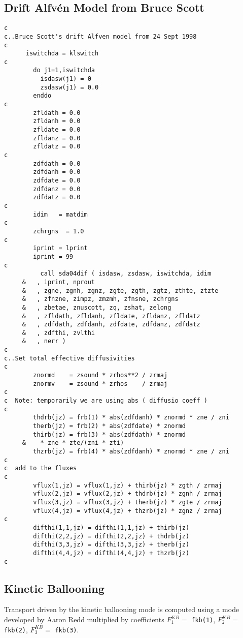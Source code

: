 \subsection{Drift Alfv\'en Model from Bruce Scott}

\begin{verbatim}
c
c..Bruce Scott's drift Alfven model from 24 Sept 1998
c
      iswitchda = klswitch
c
        do j1=1,iswitchda
          isdasw(j1) = 0
          zsdasw(j1) = 0.0
        enddo
c
        zfldath = 0.0
        zfldanh = 0.0
        zfldate = 0.0
        zfldanz = 0.0
        zfldatz = 0.0
c
        zdfdath = 0.0
        zdfdanh = 0.0
        zdfdate = 0.0
        zdfdanz = 0.0
        zdfdatz = 0.0
c
        idim   = matdim
c
        zchrgns  = 1.0
c
        iprint = lprint
        iprint = 99
c
          call sda04dif ( isdasw, zsdasw, iswitchda, idim
     &   , iprint, nprout
     &   , zgne, zgnh, zgnz, zgte, zgth, zgtz, zthte, ztzte
     &   , zfnzne, zimpz, zmzmh, zfnsne, zchrgns
     &   , zbetae, znuscott, zq, zshat, zelong
     &   , zfldath, zfldanh, zfldate, zfldanz, zfldatz
     &   , zdfdath, zdfdanh, zdfdate, zdfdanz, zdfdatz
     &   , zdfthi, zvlthi
     &   , nerr )
c
c..Set total effective diffusivities
c
        znormd    = zsound * zrhos**2 / zrmaj
        znormv    = zsound * zrhos    / zrmaj
c
c  Note: temporarily we are using abs ( diffusio coeff )
c
        thdrb(jz) = frb(1) * abs(zdfdanh) * znormd * zne / zni
        therb(jz) = frb(2) * abs(zdfdate) * znormd
        thirb(jz) = frb(3) * abs(zdfdath) * znormd
     &    * zne * zte/(zni * zti)
        thzrb(jz) = frb(4) * abs(zdfdanh) * znormd * zne / zni
c
c  add to the fluxes
c
        vflux(1,jz) = vflux(1,jz) + thirb(jz) * zgth / zrmaj
        vflux(2,jz) = vflux(2,jz) + thdrb(jz) * zgnh / zrmaj
        vflux(3,jz) = vflux(3,jz) + therb(jz) * zgte / zrmaj
        vflux(4,jz) = vflux(4,jz) + thzrb(jz) * zgnz / zrmaj
c
        difthi(1,1,jz) = difthi(1,1,jz) + thirb(jz)
        difthi(2,2,jz) = difthi(2,2,jz) + thdrb(jz)
        difthi(3,3,jz) = difthi(3,3,jz) + therb(jz)
        difthi(4,4,jz) = difthi(4,4,jz) + thzrb(jz)
c

\end{verbatim}

\subsection{Kinetic Ballooning}

Transport driven by the kinetic ballooning mode is computed using
a mode developed by Aaron Redd \cite{redd98b}
multiplied by coefficients $F_1^{KB}=$ {\tt fkb(1)}, $F_2^{KB}=$ {\tt fkb(2)},
$F_3^{KB}=$ {\tt fkb(3)}.

